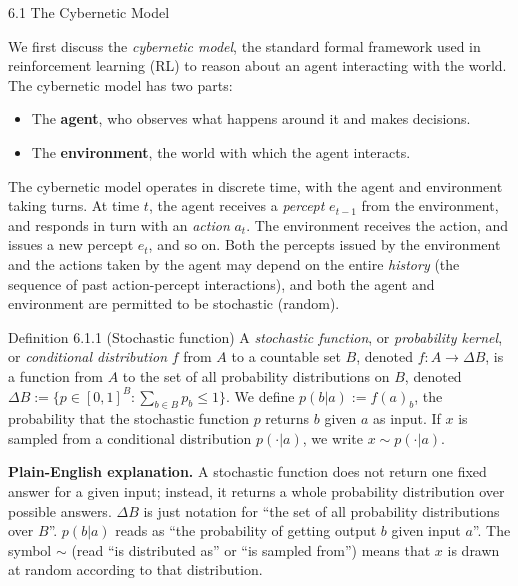 \documentclass[aspectratio=169,10pt]{beamer}
\begin{document}
\begin{frame}[allowframebreaks]{6.1 The Cybernetic Model}

We first discuss the \emph{cybernetic model}, the standard formal framework
used in reinforcement learning (RL) to reason about an agent interacting
with the world. The cybernetic model has two parts:

\begin{itemize}
  \item The \textbf{agent}, who observes what happens around it and makes
    decisions.
  \item The \textbf{environment}, the world with which the agent
    interacts.
\end{itemize}

The cybernetic model operates in discrete time, with the agent and
environment taking turns. At time $t$, the agent receives a \emph{percept}
$e_{t-1}$ from the environment, and responds in turn with an
\emph{action} $a_t$. The environment receives the action, and issues a new
percept $e_t$, and so on. Both the percepts issued by the environment and
the actions taken by the agent may depend on the entire \emph{history} (the
sequence of past action-percept interactions), and both the agent and
environment are permitted to be stochastic (random).

\vspace{0.2cm}
\begin{block}{Definition 6.1.1 (Stochastic function)}
A \emph{stochastic function}, or \emph{probability kernel}, or
\emph{conditional distribution} $f$ from $A$ to a countable set $B$,
denoted $f: A \to \Delta B$, is a function from $A$ to the set of all
probability distributions on $B$, denoted
$\Delta B := \{p \in [0,1]^B : \sum_{b \in B} p_b \le 1\}$. We define
$p(b|a) := f(a)_b$, the probability that the stochastic function $p$
returns $b$ given $a$ as input. If $x$ is sampled from a conditional
distribution $p(\cdot|a)$, we write $x \sim p(\cdot|a)$.
\end{block}

\textbf{Plain-English explanation.} A stochastic function does not return
one fixed answer for a given input; instead, it returns a whole probability
distribution over possible answers. $\Delta B$ is just notation for ``the
set of all probability distributions over $B$''. $p(b|a)$ reads as ``the
probability of getting output $b$ given input $a$''. The symbol $\sim$
(read ``is distributed as'' or ``is sampled from'') means that $x$ is drawn
at random according to that distribution.


\end{frame}
\end{document}

